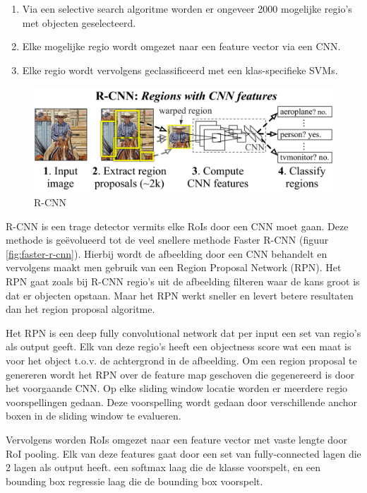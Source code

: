 \begin{enumerate}
    \item Via een selective search algoritme worden er ongeveer 2000 mogelijke regio's met objecten geselecteerd.
    \item Elke mogelijke regio wordt omgezet naar een feature vector via een CNN.
    \item Elke regio wordt vervolgens geclassificeerd met een klas-specifieke SVMs.
\end{enumerate}

\begin{figure}[!ht]
	\centering
	\includegraphics[width=0.70\linewidth]{fig/R-CNN.jpg}
	\caption{R-CNN}
	\label{fig:r-cnn}
\end{figure}

R-CNN is een trage detector vermits elke RoIs door een CNN moet gaan. 
Deze methode is ge\"evolueerd tot de veel snellere methode Faster R-CNN (figuur \ref{fig:faster-r-cnn}). 
Hierbij wordt de afbeelding door een CNN behandelt en vervolgens maakt men gebruik van een Region Proposal Network (RPN). 
Het RPN gaat zoals bij R-CNN regio's uit de afbeelding filteren waar de kans groot is dat er objecten opstaan.
Maar het RPN werkt sneller en levert betere resultaten dan het region proposal algoritme. 

Het RPN is een deep fully convolutional network dat per input een set van regio's als output geeft.
Elk van deze regio's heeft een objectness score wat een maat is voor het object t.o.v. de achtergrond in de afbeelding.
Om een region proposal te genereren wordt het RPN over de feature map geschoven die gegenereerd is door het voorgaande CNN.
Op elke sliding window locatie worden er meerdere regio voorspellingen gedaan.
Deze voorspelling wordt gedaan door verschillende anchor boxen in de sliding window te evalueren.

Vervolgens worden RoIs omgezet naar een feature vector met vaste lengte door RoI pooling.
Elk van deze features gaat door een set van fully-connected lagen die 2 lagen als output heeft.
een softmax laag die de klasse voorspelt, en een bounding box regressie laag die de bounding box voorspelt.

